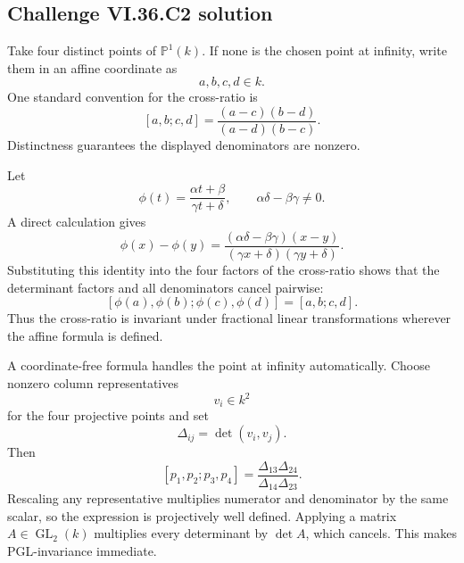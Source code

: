 \subsection*{Challenge VI.36.C2 solution}
\begin{solution}
Take four distinct points of \(\mathbb P^1(k)\). If none is the chosen point at infinity, write them in an affine
coordinate as
\[
a,b,c,d\in k.
\]
One standard convention for the cross-ratio is
\[
\boxed{
[a,b;c,d]
=
\frac{(a-c)(b-d)}{(a-d)(b-c)}.
}
\]
Distinctness guarantees the displayed denominators are nonzero.

Let
\[
\phi(t)=\frac{\alpha t+\beta}{\gamma t+\delta},
\qquad
\alpha\delta-\beta\gamma\neq0.
\]
A direct calculation gives
\[
\phi(x)-\phi(y)
=
\frac{(\alpha\delta-\beta\gamma)(x-y)}
     {(\gamma x+\delta)(\gamma y+\delta)}.
\]
Substituting this identity into the four factors of the cross-ratio shows that the determinant factors and all
denominators cancel pairwise:
\[
\boxed{
[\phi(a),\phi(b);\phi(c),\phi(d)]
=
[a,b;c,d].
}
\]
Thus the cross-ratio is invariant under fractional linear transformations wherever the affine formula is defined.

A coordinate-free formula handles the point at infinity automatically. Choose nonzero column representatives
\[
v_i\in k^2
\]
for the four projective points and set
\[
\Delta_{ij}=\det(v_i,v_j).
\]
Then
\[
\boxed{
[p_1,p_2;p_3,p_4]
=
\frac{\Delta_{13}\Delta_{24}}
     {\Delta_{14}\Delta_{23}}.
}
\]
Rescaling any representative multiplies numerator and denominator by the same scalar, so the expression is
projectively well defined. Applying a matrix \(A\in\operatorname{GL}_2(k)\) multiplies every determinant by
\(\det A\), which cancels. This makes PGL-invariance immediate.
\end{solution}


